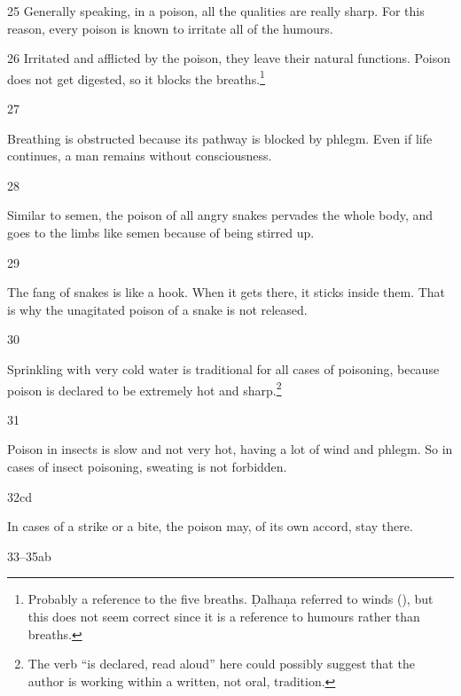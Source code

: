 \begin{translation}[resume]
\item
 [25]  Generally  speaking, in a  poison, all the  qualities are  really sharp.  For 
 this reason,  every poison is  known to irritate  all of the  humours.  

\item
[26]  Irritated and afflicted by  the poison, they leave  their natural functions.  
Poison does not get  digested, so it blocks the  breaths.\footnote{Probably  a 
reference to the five  breaths. Ḍalhaṇa  referred to winds  (), but this  
does not seem correct  since it is a reference to
  humours rather than breaths.}
  
\item[27] 
  
Breathing is obstructed because its pathway is blocked by phlegm. Even
if life continues, a man remains without consciousness.
  
\item [28]
  
Similar to semen, the poison of all angry snakes pervades the whole
body, and goes to the limbs like semen because of being stirred up.
  
%
  
\item [29]
  
The fang of snakes is like a hook.  When it gets there, it sticks
inside them. That is why the unagitated poison of a snake is not
released.
  
\item [30] 
  
Sprinkling with very cold water is traditional for all cases of
poisoning, because poison is declared to be extremely hot and
sharp.\footnote{The verb  “is declared, read aloud” here
    could possibly suggest that the author is working within a written,
    not oral, tradition.}
  
\item [31]
  
Poison in insects is slow and not very hot, having a lot of wind and
phlegm. So in cases of insect poisoning, sweating is not forbidden.
  
\item [32cd]
  
In cases of a strike or a bite, the poison may, of its own accord,
stay there.
  
\item[33--35ab]
  

\end{translation}
